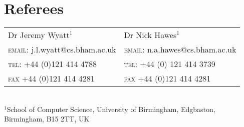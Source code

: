 \documentclass[a4paper,10pt]{article}
\begin{document}
\section{Referees}
\begin{center}
  \begin{tabular}{l|l}
  Dr Jeremy Wyatt$^1$ & Dr Nick Hawes$^1$\\ %
  \textsc{email}: j.l.wyatt@cs.bham.ac.uk&\textsc{email}: n.a.hawes@cs.bham.ac.uk\\
  \textsc{tel}: +44 (0)121 414 4788&\textsc{tel}: +44 (0) 121 414 3739\\
  \textsc{fax} +44 (0)121 414 4281&\textsc{fax} +44 (0)121 414 4281\\
\end{tabular}\\\vspace{0.2cm}
\footnotesize{$^1$School of Computer Science, University of Birmingham, Edgbaston, Birmingham, B15 2TT, UK}\\
\end{center}
\end{document}
